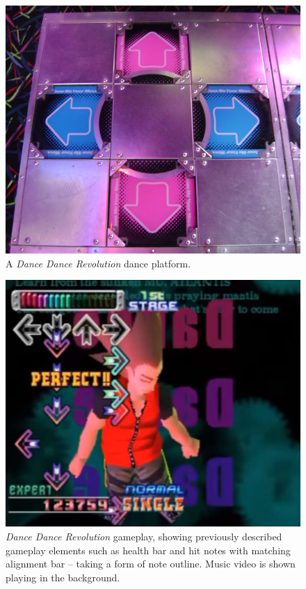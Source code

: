 \begin{figure}[h]
    \centering\includegraphics[scale=0.25]{obrazki/ddrplatform.png}
    \caption{A \textit{Dance Dance Revolution} dance platform. \cite{ddrplatform}}
    \label{fig:ddr_platform}
\end{figure}

\begin{figure}[h]
    \centering\includegraphics[scale=0.30]{obrazki/ddrgameplay.jpg}
    \caption{\textit{Dance Dance Revolution} gameplay, showing previously described gameplay elements such as health bar and hit notes with matching alignment bar -- taking a form of note outline. Music video is shown playing in the background. \cite{ddrgameplay}}
    \label{fig:ddr_gameplay}
\end{figure}

